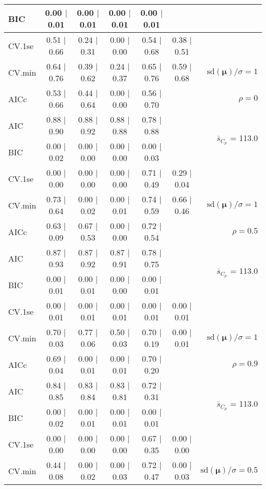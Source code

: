 \documentclass[12pt]{article}
\newcommand{\mr}[1]{\mathrm{#1}}
\newcommand{\bm}[1]{\mathbf{#1}}
\begin{document}
\begin{table}[p]
\begin{center}
\begin{tabular}{l*{5}{c}|r}
BIC & 0.00 $\mid$ 0.01 & 0.00 $\mid$ 0.01 & 0.00 $\mid$ 0.01 & 0.00 $\mid$ 0.01 & & \\
 \hline 
CV.1se & 0.51 $\mid$ 0.66 & 0.24 $\mid$ 0.31 & 0.00 $\mid$ 0.00 & 0.54 $\mid$ 0.68 & 0.38 $\mid$ 0.51 &\\
CV.min & 0.64 $\mid$ 0.76 & 0.39 $\mid$ 0.62 & 0.24 $\mid$ 0.37 & 0.65 $\mid$ 0.76 & 0.59 $\mid$ 0.68 &  $\mr{sd}(\bm{\mu})/\sigma=1$ \\
AICc & 0.53 $\mid$ 0.66 & 0.44 $\mid$ 0.64 & 0.00 $\mid$ 0.00 & 0.56 $\mid$ 0.70 & & $\rho=0$ \\
AIC & 0.88 $\mid$ 0.90 & 0.88 $\mid$ 0.92 & 0.88 $\mid$ 0.88 & 0.78 $\mid$ 0.88 & & \multirow{2}{*}{$\bar{s}_{C_p}$ = 113.0} \\
BIC & 0.00 $\mid$ 0.02 & 0.00 $\mid$ 0.00 & 0.00 $\mid$ 0.00 & 0.00 $\mid$ 0.03 & & \\
 \hline 
CV.1se & 0.00 $\mid$ 0.00 & 0.00 $\mid$ 0.00 & 0.00 $\mid$ 0.00 & 0.71 $\mid$ 0.49 & 0.29 $\mid$ 0.04 &\\
CV.min & 0.73 $\mid$ 0.64 & 0.00 $\mid$ 0.02 & 0.00 $\mid$ 0.01 & 0.74 $\mid$ 0.59 & 0.66 $\mid$ 0.46 &  $\mr{sd}(\bm{\mu})/\sigma=1$ \\
AICc & 0.63 $\mid$ 0.09 & 0.67 $\mid$ 0.53 & 0.00 $\mid$ 0.00 & 0.72 $\mid$ 0.54 & & $\rho=0.5$ \\
AIC & 0.87 $\mid$ 0.93 & 0.87 $\mid$ 0.92 & 0.87 $\mid$ 0.91 & 0.78 $\mid$ 0.75 & & \multirow{2}{*}{$\bar{s}_{C_p}$ = 113.0} \\
BIC & 0.00 $\mid$ 0.01 & 0.00 $\mid$ 0.01 & 0.00 $\mid$ 0.00 & 0.00 $\mid$ 0.01 & & \\
 \hline 
CV.1se & 0.00 $\mid$ 0.01 & 0.00 $\mid$ 0.01 & 0.00 $\mid$ 0.01 & 0.00 $\mid$ 0.01 & 0.00 $\mid$ 0.01 &\\
CV.min & 0.70 $\mid$ 0.03 & 0.77 $\mid$ 0.06 & 0.50 $\mid$ 0.03 & 0.70 $\mid$ 0.19 & 0.00 $\mid$ 0.01 &  $\mr{sd}(\bm{\mu})/\sigma=1$ \\
AICc & 0.69 $\mid$ 0.04 & 0.00 $\mid$ 0.01 & 0.00 $\mid$ 0.01 & 0.70 $\mid$ 0.20 & & $\rho=0.9$ \\
AIC & 0.84 $\mid$ 0.85 & 0.83 $\mid$ 0.84 & 0.83 $\mid$ 0.81 & 0.72 $\mid$ 0.31 & & \multirow{2}{*}{$\bar{s}_{C_p}$ = 113.0} \\
BIC & 0.00 $\mid$ 0.02 & 0.00 $\mid$ 0.01 & 0.00 $\mid$ 0.01 & 0.00 $\mid$ 0.01 & & \\
 \hline 
CV.1se & 0.00 $\mid$ 0.00 & 0.00 $\mid$ 0.00 & 0.00 $\mid$ 0.00 & 0.67 $\mid$ 0.35 & 0.00 $\mid$ 0.00 &\\
CV.min & 0.44 $\mid$ 0.08 & 0.00 $\mid$ 0.02 & 0.00 $\mid$ 0.03 & 0.72 $\mid$ 0.47 & 0.00 $\mid$ 0.03 &  $\mr{sd}(\bm{\mu})/\sigma=0.5$ \\

\end{tabular}
\end{center}
\end{table}
\end{document}
